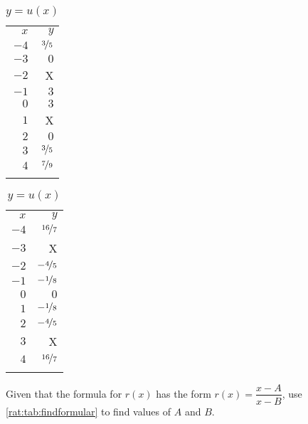 \begin{exercises}
\begin{problem}
\begin{table}[!htb]
\begin{widepage}
\begin{subtable}{.2\textwidth}
		\centering
		\caption{$y=t(x)$}
		\label{rat:tab:findformulat}
		\begin{tabular}{rr}
			\beforeheading
			$x$  & $y$               \\ \afterheading
			$-4$ & $\nicefrac{3}{5}$ \\\normalline
			$-3$ & $0$               \\\normalline
			$-2$ & X                 \\\normalline
			$-1$ & $3$               \\\normalline
			$0$  & $3$               \\\normalline
			$1$  & X                 \\\normalline
			$2$  & $0$               \\\normalline
			$3$  & $\nicefrac{3}{5}$ \\\normalline
			$4$  & $\nicefrac{7}{9}$ \\\lastline
		\end{tabular}
	\end{subtable}
	\hfill
	\begin{subtable}{.2\textwidth}
		\centering
		\caption{$y=u(x)$}
		\label{rat:tab:findformulau}
		\begin{tabular}{rr}
			\beforeheading
			$x$  & $y$                \\ \afterheading
			$-4$ & $\nicefrac{16}{7}$ \\\normalline
			$-3$ & X                  \\\normalline
			$-2$ & $-\nicefrac{4}{5}$ \\\normalline
			$-1$ & $-\nicefrac{1}{8}$ \\\normalline
			$0$  & $0$                \\\normalline
			$1$  & $-\nicefrac{1}{8}$ \\\normalline
			$2$  & $-\nicefrac{4}{5}$ \\\normalline
			$3$  & X                  \\\normalline
			$4$  & $\nicefrac{16}{7}$ \\\lastline
		\end{tabular}
	\end{subtable}
	\end{widepage}
\end{table}
\begin{subproblem}
	Given that the formula for $r(x)$ has the form $r(x)=\dfrac{x-A}{x-B}$, use \cref{rat:tab:findformular}
	to find values of $A$ and $B$.
	\begin{shortsolution}

\end{shortsolution}
\end{subproblem}
\end{problem}
\end{exercises}
